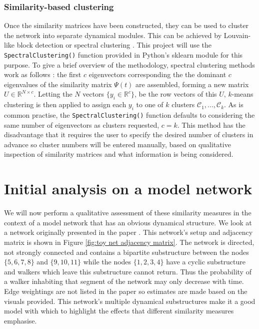 \documentclass[12pt,a4paper]{article}
\begin{document}
\subsubsection{Similarity-based clustering}\label{section:spectral clustering}
Once the similarity matrices have been constructed, they can be used to cluster the network into separate dynamical modules. This can be achieved by Louvain-like block detection or spectral clustering \cite{schaub2019multiscale}. This project will use the \texttt{SpectralClustering()} function provided in Python's sklearn module \cite{scikit-learn} for this purpose. \medskip
\noindent To give a brief overview of the methodology, spectral clustering methods work as follows \cite{lambiottenotes,schaub2019multiscale,Luxburg07atutorial}: the first $c$ eigenvectors corresponding the the dominant $c$ eigenvalues of the similarity matrix $\Psi(t)$ are assembled, forming a new matrix $U \in \mathbb{R}^{N \times c}$. Letting the $N$ vectors $ \{ y_i \in \mathbb{R}^c \} $, be the row vectors of this $U$, $k$-means clustering is then applied to assign each $y_i$ to one of $k$ clusters $\mathcal C_1,...,\mathcal C_k $. As is common practise, the \texttt{SpectralClustering()} function defaults to considering the same number of eigenvectors as clusters requested, $c=k$. This method has the disadvantage that it requires the user to specify the desired number of clusters in advance so cluster numbers will be entered manually, based on qualitative inspection of similarity matrices and what information is being considered.

\section{Initial analysis on a model network}\label{section:model network}
We will now perform a qualitative assessment of these similarity measures in the context of a model network that has an obvious dynamical structure. We look at a network originally presented in the paper \cite{schaub2019multiscale}. This network's setup and adjacency matrix is shown in Figure \ref{fig:toy net adjacency matrix}.  The network is directed, not strongly connected \cite{schaub2019multiscale} and contains a bipartite substructure between the nodes $\{5,6,7,8\}$ and $\{ 9,10,11 \}$ while the nodes $\{ 1,2,3,4 \}$ have a cyclic substructure and walkers which leave this substructure cannot return. Thus the probability of a walker inhabiting that segment of the network may only decrease with time. Edge weightings are not listed in the paper so estimates are made based on the visuals provided. This network's multiple dynamical substructures make it a good model with which to highlight the effects that different similarity measures emphasise. \medskip
\end{document}
